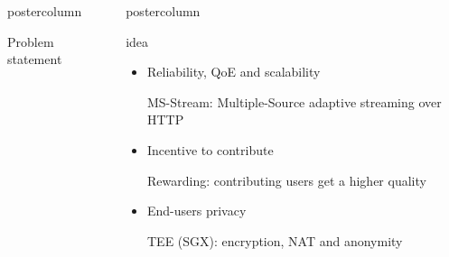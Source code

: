 \begin{frame}
\begin{columns}
\begin{column}{.49\textwidth}
\begin{beamercolorbox}[center,wd=\textwidth]{postercolumn}
\begin{minipage}[T]{.95\textwidth}
{\begin{block}{Problem statement}
            \end{block}
            
          }
        \end{minipage}
      \end{beamercolorbox}
    \end{column}
    \begin{column}{.49\textwidth}
      \begin{beamercolorbox}[center,wd=\textwidth]{postercolumn}
        \begin{minipage}[T]{.95\textwidth}
          \parbox[t][\columnheight]{\textwidth}{
            
            \begin{block}{\pname idea}
            
            \begin{itemize}
            
            \item Reliability, QoE and scalability
            
            MS-Stream: Multiple-Source adaptive streaming over HTTP
            
            \item Incentive to contribute
            
            Rewarding: contributing users get a higher quality
            
            \item End-users privacy
            
            TEE (SGX): encryption, NAT and anonymity
            
            \end{itemize}
            
            \end{block}
            
}
\end{minipage}
\end{beamercolorbox}
\end{column}
\end{columns}
\end{frame}
